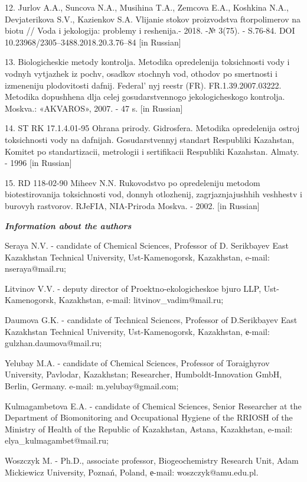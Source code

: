 12. Jurlov A.A., Suncova N.A., Musihina T.A., Zemcova E.A., Koshkina
N.A., Devjaterikova S.V., Kazienkov S.A. Vlijanie stokov proizvodstva
ftorpolimerov na biotu // Voda i jekologija: problemy i reshenija.-
2018. -№ 3(75). - S.76-84. DOI 10.23968/2305--3488.2018.20.3.76--84
{[}in Russian{]}

13. Biologicheskie metody kontrolja. Metodika opredelenija toksichnosti
vody i vodnyh vytjazhek iz pochv, osadkov stochnyh vod, othodov po
smertnosti i izmeneniju plodovitosti dafnij. Federal' nyj
reestr (FR). FR.1.39.2007.03222. Metodika dopushhena dlja celej
gosudarstvennogo jekologicheskogo kontrolja. Moskva.: «AKVAROS», 2007. -
47 s. {[}in Russian{]}

14. ST RK 17.1.4.01-95 Ohrana prirody. Gidrosfera. Metodika opredelenija
ostroj toksichnosti vody na dafnijah. Gosudarstvennyj standart
Respubliki Kazahstan, Komitet po standartizacii, metrologii i
sertifikacii Respubliki Kazahstan. Almaty. - 1996 {[}in Russian{]}

15. RD 118-02-90 Miheev N.N. Rukovodstvo po opredeleniju metodom
biotestirovanija toksichnosti vod, donnyh otlozhenij, zagrjaznjajushhih
veshhestv i burovyh rastvorov. RJeFIA, NIA-Priroda Moskva. - 2002. {[}in
Russian{]}

\emph{{\bfseries Information about the authors}}

Seraya N.V. - candidate of Chemical Sciences, Professor of D. Serikbayev
East Kazakhstan Technical University, Ust-Kamenogorsk\emph{,}
Kazakhstan, e-mail:
nseraya@mail.ru;

Litvinov V.V. - deputy director of Proektno-ekologicheskoe bjuro LLP,
Ust-Kamenogorsk, Kazakhstan, e-mail:
litvinov_vadim@mail.ru;

Daumova G.K. - candidate of Technical Sciences, Professor of
D.Serikbayev East Kazakhstan Technical University,
Ust-Kamenogorsk\emph{,} Kazakhstan, е-mail:
gulzhan.daumova@mail.ru;

Yelubay M.A. - candidate of Chemical Sciences, Professor of Toraighyrov
University, Pavlodar, Kazakhstan; Researcher, Humboldt-Innovation GmbH,
Berlin, Germany. e-mail: m.yelubay@gmail.com;

Kulmagambetova E.A. - candidate of Chemical Sciences, Senior Researcher
at the Department of Biomonitoring and Occupational Hygiene of the
RRIOSH of the Ministry of Health of the Republic of Kazakhstan, Astana,
Kazakhstan, e-mail:
elya_kulmagambet@mail.ru;

Woszczyk M. - Ph.D., associate professor, Biogeochemistry Research Unit,
Adam Mickiewicz University, Poznań, Poland, е-mail:
woszczyk@amu.edu.pl.


